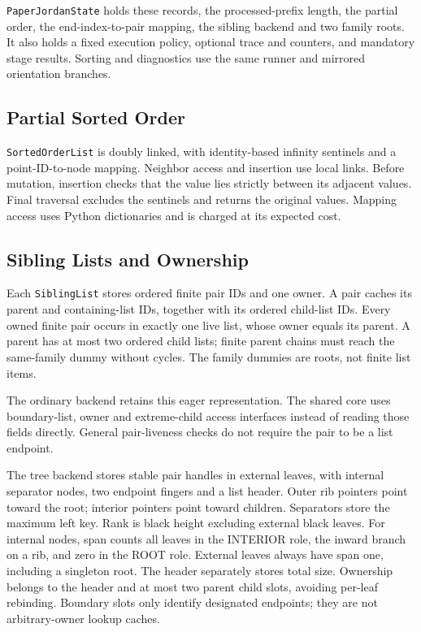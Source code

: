 \texttt{PaperJordanState} holds these records, the processed-prefix length,
the partial order, the end-index-to-pair mapping, the sibling backend and two
family roots. It also holds a fixed execution policy, optional trace and
counters, and mandatory stage results. Sorting and diagnostics use the same
runner and mirrored orientation branches.

\subsection{Partial Sorted Order}
\label{sec:implementation-partial-order}

\texttt{SortedOrderList} is doubly linked, with identity-based infinity
sentinels and a point-ID-to-node mapping. Neighbor access and insertion use
local links. Before mutation, insertion checks that the value lies strictly
between its adjacent values. Final traversal excludes the sentinels and
returns the original values. Mapping access uses Python dictionaries and is
charged at its expected cost.

\subsection{Sibling Lists and Ownership}
\label{sec:implementation-sibling-lists}

Each \texttt{SiblingList} stores ordered finite pair IDs and one owner.
A pair caches its parent and containing-list IDs, together with its ordered
child-list IDs. Every owned finite pair occurs in exactly one live list,
whose owner equals its parent. A parent has at most two ordered child lists;
finite parent chains must reach the same-family dummy without cycles.
The family dummies are roots, not finite list items.

The ordinary backend retains this eager representation. The shared core
uses boundary-list, owner and extreme-child access interfaces instead of
reading those fields directly. General pair-liveness checks do not require
the pair to be a list endpoint.

The tree backend stores stable pair handles in external leaves, with internal
separator nodes, two endpoint fingers and a list header. Outer rib pointers
point toward the root; interior pointers point toward children. Separators
store the maximum left key. Rank is black height excluding external black
leaves. For internal nodes, span counts all leaves in the INTERIOR role, the
inward branch on a rib, and zero in the ROOT role. External leaves always have
span one, including a singleton root. The header separately stores total size.
Ownership belongs to the header and at
most two parent child slots, avoiding per-leaf rebinding. Boundary slots only
identify designated endpoints; they are not arbitrary-owner lookup caches.

